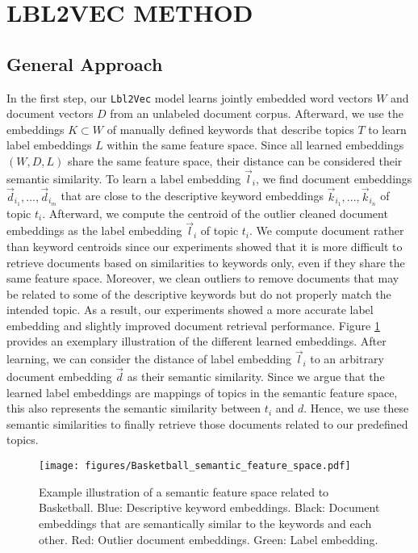 \documentclass[a4paper,twoside]{article}
\begin{document}
\section{\uppercase{Lbl2Vec Method}}
\label{sec:lbl2vec_method}

\subsection{General Approach}

In the first step, our \texttt{Lbl2Vec} model learns jointly embedded word vectors $W$ and document vectors $D$ from an unlabeled document corpus. Afterward, we use the embeddings $K \subset W$ of manually defined keywords that describe topics $T$ to learn label embeddings $L$ within the same feature space. Since all learned embeddings $(W,D,L)$ share the same feature space, their distance can be considered their semantic similarity. To learn a label embedding $\vec{l}_i$, we find document embeddings $\vec{d}_{i_1},...,\vec{d}_{i_m}$ that are close to the descriptive keyword embeddings $\vec{k}_{i_1},...,\vec{k}_{i_n}$ of topic $t_i$. Afterward, we compute the centroid of the outlier cleaned document embeddings as the label embedding $\vec{l}_i$ of topic $t_i$. We compute document rather than keyword centroids since our experiments showed that it is more difficult to retrieve documents based on similarities to keywords only, even if they share the same feature space. Moreover, we clean outliers to remove documents that may be related to some of the descriptive keywords but do not properly match the intended topic. As a result, our experiments showed a more accurate label embedding and slightly improved document retrieval performance. Figure \ref{fig:basketball_feature_space} provides an exemplary illustration of the different learned embeddings. After learning, we can consider the distance of label embedding $\vec{l}_{i}$ to an arbitrary document embedding $\vec{d}$ as their semantic similarity. Since we argue that the learned label embeddings are mappings of topics in the semantic feature space, this also represents the semantic similarity between $t_{i}$ and ${d}$. Hence, we use these semantic similarities to finally retrieve those documents related to our predefined topics.
\begin{figure}[ht]
    \centering
    \texttt{[image: figures/Basketball\_semantic\_feature\_space.pdf]}
    \caption{Example illustration of a semantic feature space related to Basketball. Blue: Descriptive keyword embeddings. Black: Document embeddings that are semantically similar to the keywords and each other. Red: Outlier document embeddings. Green: Label embedding.}
    \label{fig:basketball_feature_space}
\end{figure}
\end{document}
